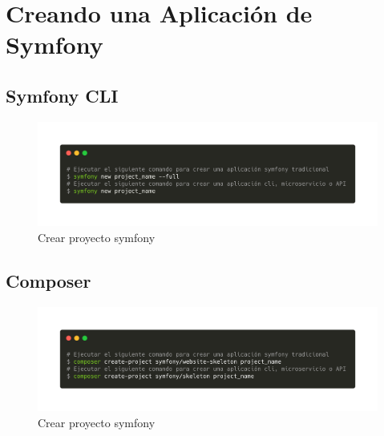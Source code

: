 \section{Creando una Aplicación de Symfony}
\subsection{Symfony CLI}
\begin{figure}[htbp]
    \centering
    \includegraphics[width=\textwidth]{../assets/symfony_new.png}
    \caption{Crear proyecto symfony}
    \label{fig:symfony_new}
\end{figure}
\subsection{Composer}
\begin{figure}[htbp]
    \centering
    \includegraphics[width=\textwidth]{../assets/composer_create.png}
    \caption{Crear proyecto symfony}
    \label{fig:composer_create}
\end{figure}